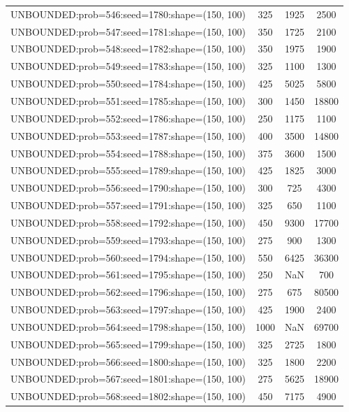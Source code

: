\begin{longtable}{lccc}
UNBOUNDED:prob=546:seed=1780:shape=(150, 100) &      325 &  1925 &   2500 \\
UNBOUNDED:prob=547:seed=1781:shape=(150, 100) &      350 &  1725 &   2100 \\
UNBOUNDED:prob=548:seed=1782:shape=(150, 100) &      350 &  1975 &   1900 \\
UNBOUNDED:prob=549:seed=1783:shape=(150, 100) &      325 &  1100 &   1300 \\
UNBOUNDED:prob=550:seed=1784:shape=(150, 100) &      425 &  5025 &   5800 \\
UNBOUNDED:prob=551:seed=1785:shape=(150, 100) &      300 &  1450 &  18800 \\
UNBOUNDED:prob=552:seed=1786:shape=(150, 100) &      250 &  1175 &   1100 \\
UNBOUNDED:prob=553:seed=1787:shape=(150, 100) &      400 &  3500 &  14800 \\
UNBOUNDED:prob=554:seed=1788:shape=(150, 100) &      375 &  3600 &   1500 \\
UNBOUNDED:prob=555:seed=1789:shape=(150, 100) &      425 &  1825 &   3000 \\
UNBOUNDED:prob=556:seed=1790:shape=(150, 100) &      300 &   725 &   4300 \\
UNBOUNDED:prob=557:seed=1791:shape=(150, 100) &      325 &   650 &   1100 \\
UNBOUNDED:prob=558:seed=1792:shape=(150, 100) &      450 &  9300 &  17700 \\
UNBOUNDED:prob=559:seed=1793:shape=(150, 100) &      275 &   900 &   1300 \\
UNBOUNDED:prob=560:seed=1794:shape=(150, 100) &      550 &  6425 &  36300 \\
UNBOUNDED:prob=561:seed=1795:shape=(150, 100) &      250 &   NaN &    700 \\
UNBOUNDED:prob=562:seed=1796:shape=(150, 100) &      275 &   675 &  80500 \\
UNBOUNDED:prob=563:seed=1797:shape=(150, 100) &      425 &  1900 &   2400 \\
UNBOUNDED:prob=564:seed=1798:shape=(150, 100) &     1000 &   NaN &  69700 \\
UNBOUNDED:prob=565:seed=1799:shape=(150, 100) &      325 &  2725 &   1800 \\
UNBOUNDED:prob=566:seed=1800:shape=(150, 100) &      325 &  1800 &   2200 \\
UNBOUNDED:prob=567:seed=1801:shape=(150, 100) &      275 &  5625 &  18900 \\
UNBOUNDED:prob=568:seed=1802:shape=(150, 100) &      450 &  7175 &   4900 \\

\end{longtable}
